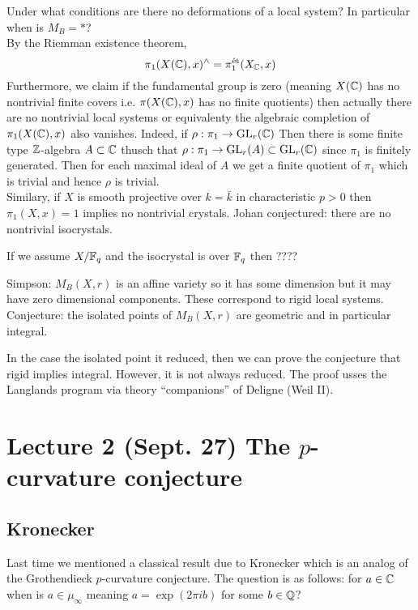 \documentclass[12pt]{article}
\begin{document}
Under what conditions are there no deformations of a local system? In particular when is $M_B = *$? 
\bigskip\\
By the Riemman existence theorem, 
\[ \pi_1(X(\mathbb{C}), x)^{\wedge} = \pi_1^{\text{\'{e}t}}(X_{\mathbb{C}}, x) \]
Furthermore, we claim if the \etale fundamental group is zero (meaning $X(\mathbb{C})$ has no nontrivial finite covers i.e. $\pi(X(\mathbb{C}), x)$ has no finite quotients) then actually there are no nontrivial local systems or equivalenty the algebraic completion of $\pi_1(X(\mathbb{C}), x)$ also vanishes. Indeed, if $\rho : \pi_1 \to \mathrm{GL}_r(\mathbb{C})$ Then there is some finite type $\mathbb{Z}$-algebra $A \subset \mathbb{C}$ thusch that $\rho : \pi_1 \to \mathrm{GL}_r(A) \subset \mathrm{GL}_r(\mathbb{C})$ since $\pi_1$ is finitely generated. Then for each maximal ideal of $A$ we get a finite quotient of $\pi_1$ which is trivial and hence $\rho$ is trivial. 
\bigskip\\
Similary, if $X$ is smooth projective over $k = \bar{k}$ in characteristic $p > 0$ then $\pi_1(X, x) = 1$ implies no nontrivial crystals. Johan conjectured: there are no nontrivial isocrystals. 

\begin{rmk}
If we assume $X / \mathbb{F}_q$ and the isocrystal is over $\mathbb{F}_q$ then ????
\end{rmk}  

Simpson: $M_B(X, r)$ is an affine variety so it has some dimension but it may have zero dimensional components. These correspond to rigid local systems. Conjecture: the isolated points of $M_B(X, r)$ are geometric and in particular integral. 


In the case the isolated point it reduced, then we can prove the conjecture that rigid implies integral. However, it is not always reduced. The proof usses the Langlands program via theory ``companions'' of Deligne (Weil II). 


\section{Lecture 2 (Sept. 27) The $p$-curvature conjecture}

\subsection{Kronecker}

Last time we mentioned a classical result due to Kronecker which is an analog of the Grothendieck $p$-curvature conjecture. The question is as follows: for $a \in \mathbb{C}$ when is $a \in \mu_{\infty}$ meaning $a = \exp(2 \pi i b)$ for some $b \in \mathbb{Q}$?
\end{document}
